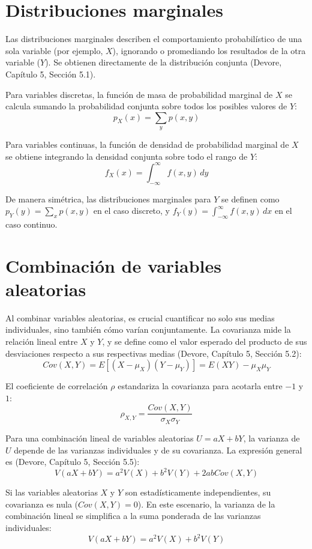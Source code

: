 \section{Distribuciones marginales}

Las distribuciones marginales describen el comportamiento probabilístico de una sola variable (por ejemplo, $X$), ignorando o promediando los resultados de la otra variable ($Y$). Se obtienen directamente de la distribución conjunta (Devore, Capítulo 5, Sección 5.1).

Para variables discretas, la función de masa de probabilidad marginal de $X$ se calcula sumando la probabilidad conjunta sobre todos los posibles valores de $Y$:
$$ p_X(x) = \sum_{y} p(x,y) $$

Para variables continuas, la función de densidad de probabilidad marginal de $X$ se obtiene integrando la densidad conjunta sobre todo el rango de $Y$:
$$ f_X(x) = \int_{-\infty}^{\infty} f(x,y) \, dy $$

De manera simétrica, las distribuciones marginales para $Y$ se definen como $p_Y(y) = \sum_{x} p(x,y)$ en el caso discreto, y $f_Y(y) = \int_{-\infty}^{\infty} f(x,y) \, dx$ en el caso continuo.

\section{Combinación de variables aleatorias}

Al combinar variables aleatorias, es crucial cuantificar no solo sus medias individuales, sino también cómo varían conjuntamente. La covarianza mide la relación lineal entre $X$ y $Y$, y se define como el valor esperado del producto de sus desviaciones respecto a sus respectivas medias (Devore, Capítulo 5, Sección 5.2):
$$ Cov(X,Y) = E[(X-\mu_X)(Y-\mu_Y)] = E(XY) - \mu_X\mu_Y $$

El coeficiente de correlación $\rho$ estandariza la covarianza para acotarla entre $-1$ y $1$:
$$ \rho_{X,Y} = \frac{Cov(X,Y)}{\sigma_X \sigma_Y} $$

Para una combinación lineal de variables aleatorias $U = aX + bY$, la varianza de $U$ depende de las varianzas individuales y de su covarianza. La expresión general es (Devore, Capítulo 5, Sección 5.5):
$$ V(aX + bY) = a^2V(X) + b^2V(Y) + 2abCov(X,Y) $$

Si las variables aleatorias $X$ y $Y$ son estadísticamente independientes, su covarianza es nula ($Cov(X,Y) = 0$). En este escenario, la varianza de la combinación lineal se simplifica a la suma ponderada de las varianzas individuales:
$$ V(aX + bY) = a^2V(X) + b^2V(Y) $$


